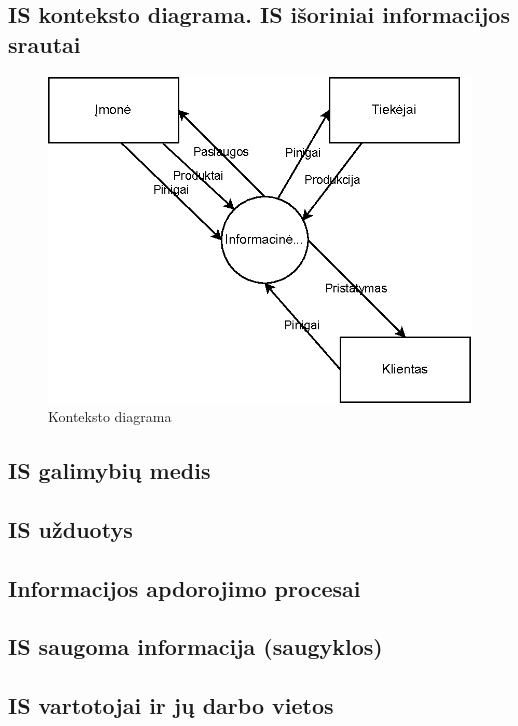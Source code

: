 \documentclass{VUMIFPSkursinis}
\begin{document}
\subsection{IS konteksto diagrama. IS išoriniai informacijos srautai}
\begin{figure}[H]
    \centering
    \includegraphics[scale=1]{img/KontekstoDiagrama}
    \caption{Konteksto diagrama}
    \label{img:mlp}
\end{figure}
\newpage
\subsection{IS galimybių medis}

\newpage
\subsection{IS užduotys}

\newpage
\subsection{Informacijos apdorojimo procesai}

\newpage
\subsection{IS saugoma informacija (saugyklos)}

\newpage
\subsection{IS vartotojai ir jų darbo vietos}
\end{document}
